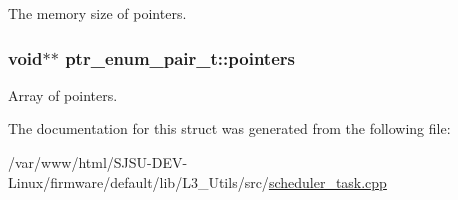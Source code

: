 The memory size of pointers. 

\subsubsection[{\texorpdfstring{pointers}{pointers}}]{\setlength{\rightskip}{0pt plus 5cm}void$\ast$$\ast$ ptr\+\_\+enum\+\_\+pair\+\_\+t\+::pointers}\hypertarget{structptr__enum__pair__t_ae18583c8ba1ddc5f25d45cc0a8022c97}{}\label{structptr__enum__pair__t_ae18583c8ba1ddc5f25d45cc0a8022c97}


Array of pointers. 



The documentation for this struct was generated from the following file\+:\begin{DoxyCompactItemize}
\item 
/var/www/html/\+S\+J\+S\+U-\/\+D\+E\+V-\/\+Linux/firmware/default/lib/\+L3\+\_\+\+Utils/src/\hyperlink{scheduler__task_8cpp}{scheduler\+\_\+task.\+cpp}\end{DoxyCompactItemize}
